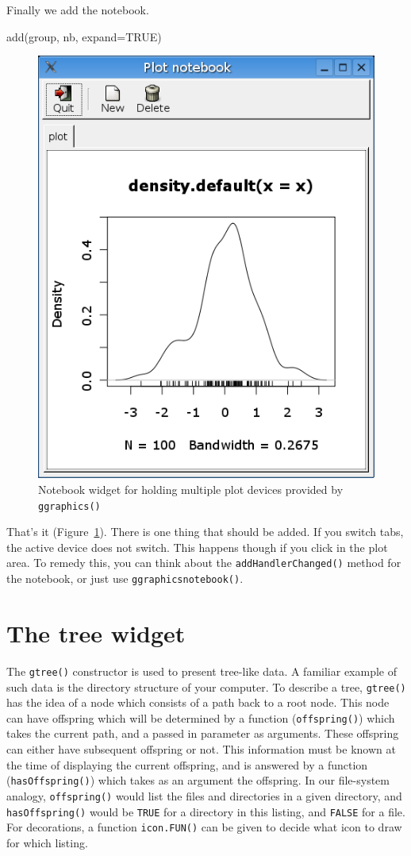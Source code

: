 \documentclass[12pt]{article}
\newcommand{\RCode}[1]{\texttt{#1}}
\newcommand{\RFunc}[1]{\texttt{#1()}}
\begin{document}
Finally we add the notebook.
\begin{Scode}
  add(group, nb, expand=TRUE)
\end{Scode}

\begin{figure}[htbp]
  \centering
  \includegraphics[width=.6\textwidth]{notebook}
  \caption{Notebook widget for holding multiple plot devices provided by \RFunc{ggraphics}}
  \label{fig:notebook}
\end{figure}

That's it (Figure~\ref{fig:notebook}). There is one thing that should
be added. If you switch tabs, the active device does not switch. This
happens though if you click in the plot area. To remedy this, you can
think about the \RFunc{addHandlerChanged} method for the notebook, or
just use \RFunc{ggraphicsnotebook}.



\section{The tree widget}

The \RFunc{gtree} constructor is used to present tree-like data. A
familiar example of such data is the directory structure of your
computer. To describe a tree, \RFunc{gtree} has the idea of a node
which consists of a path back to a root node. This node can have
offspring which will be determined by a function (\RFunc{offspring})
which takes the current path, and a passed in parameter as
arguments. These offspring can either have subsequent offspring or
not. This information must be known at the time of displaying the current
offspring, and is answered by a function (\RFunc{hasOffspring}) which
takes as an argument the offspring. In our file-system  analogy, \RFunc{offspring}
would list the files and directories in a given directory, and
\RFunc{hasOffspring} would be \RCode{TRUE} for a directory in this
listing, and \RCode{FALSE} for a file. For decorations, a function
\RFunc{icon.FUN} can be given to decide what icon to draw for which
listing.
\end{document}

